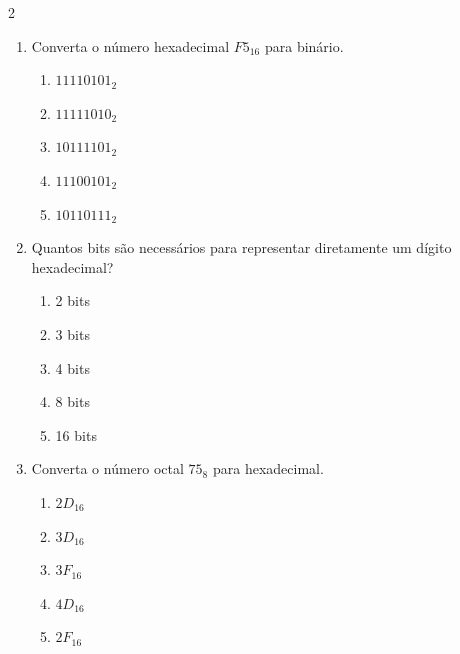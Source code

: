 \documentclass[a4paper,12pt]{article}
\begin{document}
\begin{multicols}{2}
\begin{enumerate}[leftmargin=*]
\begin{enumerate}[label=(\Alph*)]
    \item $01111010_2$
    \item $01110110_2$
    \item $11101010_2$
    \item $01111001_2$
    \item $10100111_2$
\end{enumerate}

\vspace{0.2cm}

\item Converta o número hexadecimal $F5_{16}$ para binário.

\begin{enumerate}[label=(\Alph*)]
    \item $11110101_2$
    \item $11111010_2$
    \item $10111101_2$
    \item $11100101_2$
    \item $10110111_2$
\end{enumerate}

\vspace{0.2cm}

\item Quantos bits são necessários para representar diretamente um dígito hexadecimal?

\begin{enumerate}[label=(\Alph*)]
    \item 2 bits
    \item 3 bits
    \item 4 bits
    \item 8 bits
    \item 16 bits
\end{enumerate}

\vspace{0.2cm}


\item Converta o número octal $75_8$ para hexadecimal.

\begin{enumerate}[label=(\Alph*)]
    \item $2D_{16}$
    \item $3D_{16}$
    \item $3F_{16}$
    \item $4D_{16}$
    \item $2F_{16}$
\end{enumerate}


\end{enumerate}
\end{multicols}
\end{document}
